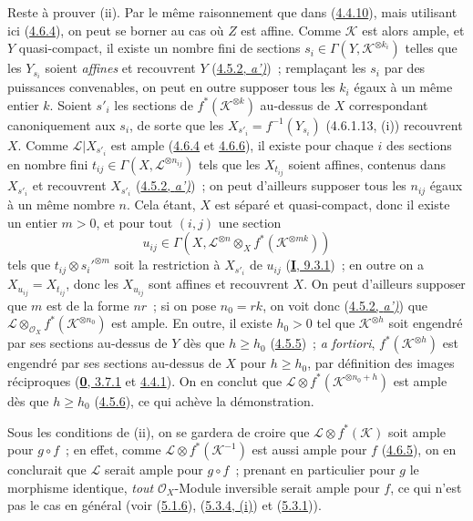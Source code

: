 Reste à prouver (ii). Par le même raisonnement que dans
(\hyperref[II.4.4.10-fr]{4.4.10}), mais utilisant ici
(\hyperref[II.4.6.4-fr]{4.6.4}), on peut se borner au cas où $Z$ est
affine. Comme $\mathcal{K}$ est alors ample, et $Y$ quasi-compact, il existe
un nombre fini de sections $s_i\in\Gamma(Y,\mathcal{K}^{\otimes k_i})$
telles que les $Y_{s_i}$
soient \emph{affines} et recouvrent $Y$
(\hyperref[II.4.5.2-fr]{4.5.2, \emph{a')}})~;
remplaçant les $s_i$ par des puissances convenables, on peut en outre
supposer tous les $k_i$ égaux à un même entier $k$. Soient $s'_i$ les
sections de $f^*(\mathcal{K}^{\otimes k})$ au-dessus de $X$ correspondant
canoniquement aux $s_i$, de sorte que les
$X_{s'_i}=f^{-1}(Y_{s_i})$ (4.6.1.13, (i))
recouvrent $X$. Comme $\mathcal{L}|X_{s'_i}$ est ample
(\hyperref[II.4.6.4-fr]{4.6.4} et
\hyperref[II.4.6.6-fr]{4.6.6}), il existe pour chaque $i$ des sections en
nombre fini $t_{ij}\in\Gamma(X,\mathcal{L}^{\otimes n_{ij}})$ tels que les
$X_{t_{ij}}$ soient affines, contenus dans $X_{s'_i}$ et recouvrent
$X_{s'_i}$ (\hyperref[II.4.5.2-fr]{4.5.2, \emph{a')}})~; on peut d'ailleurs
supposer tous les $n_{ij}$ égaux à un même nombre $n$. Cela étant, $X$ est
séparé et quasi-compact, donc il existe un entier $m>0$, et pour tout
$(i,j)$ une section
\[
  u_{ij}\in\Gamma(X,\mathcal{L}^{\otimes n}\otimes_X
  f^*(\mathcal{K}^{\otimes mk}))
\]
tels que $t_{ij}\otimes s_i'^{\otimes m}$ soit la restriction à $X_{s'_i}$
de $u_{ij}$ (\hyperref[I.9.3.1-fr]{\textbf{I}, 9.3.1})~; en outre on a
$X_{u_{ij}}=X_{t_{ij}}$, donc les $X_{u_{ij}}$ sont affines et recouvrent
$X$. On peut d'ailleurs supposer que $m$ est de la forme $nr$~; si on pose
$n_0=rk$, on voit donc (\hyperref[II.4.5.2-fr]{4.5.2, \emph{a')}}) que
$\mathcal{L}\otimes_{\mathcal{O}_X}f^*(\mathcal{K}^{\otimes n_0})$ est
ample. En outre,
il existe $h_0>0$ tel que $\mathcal{K}^{\otimes h}$ soit engendré par ses
sections au-dessus de $Y$ dès que $h\geq h_0$
(\hyperref[II.4.5.5-fr]{4.5.5})~; \emph{a fortiori},
$f^*(\mathcal{K}^{\otimes h})$ est engendré par ses sections au-dessus de
$X$ pour $h\geq h_0$, par définition des images réciproques
(\hyperref[0.3.7.1-fr]{\textbf{0}, 3.7.1} et
\hyperref[0.4.4.1-fr]{4.4.1}). On en conclut que
$\mathcal{L}\otimes f^*(\mathcal{K}^{\otimes n_0+h})$ est ample dès que
$h\geq h_0$ (\hyperref[II.4.5.6-fr]{4.5.6}), ce qui achève la
démonstration.

\begin{remark}[4.6.14]
\label{II.4.6.14-fr}
Sous les conditions de (ii), on se gardera de croire que
$\mathcal{L}\otimes f^*(\mathcal{K})$ soit ample pour $g\circ f$~; en effet,
comme $\mathcal{L}\otimes f^*(\mathcal{K}^{-1})$ est aussi ample pour $f$
(\hyperref[II.4.6.5-fr]{4.6.5}), on en conclurait que $\mathcal{L}$ serait
ample pour $g\circ f$~; prenant en particulier pour $g$ le morphisme
identique, \emph{tout} $\mathcal{O}_X$-Module inversible serait ample pour $f$, ce
qui n'est pas le cas en général (voir (\hyperref[II.5.1.6-fr]{5.1.6}),
(\hyperref[II.5.3.4-fr]{5.3.4, (i)}) et
(\hyperref[II.5.3.1-fr]{5.3.1})).
\end{remark}

